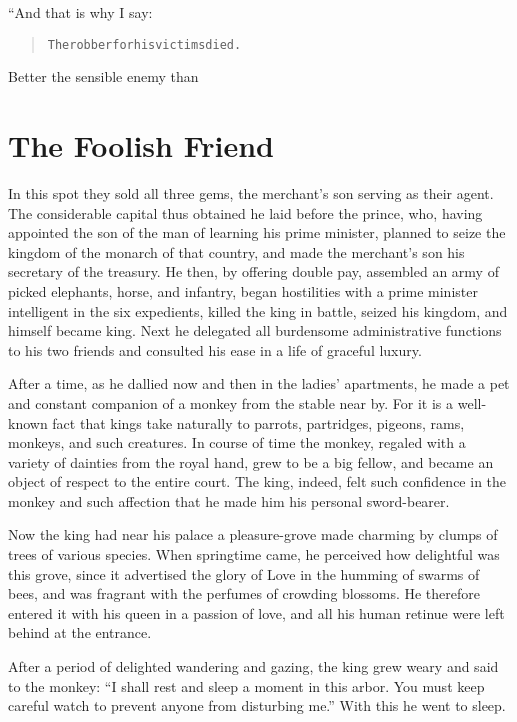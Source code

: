 \documentclass[article, twoside, 14pt]{memoir}
\renewenvironment{verbatim}{%
\begin{quote}%
\vskip -10pt%
\begin{alltt}\normalfont\large}{\end{alltt}%
\end{quote}%
\vskip -10pt
} %
\begin{document}
“And that is why I say:

\begin{verbatim}
The robber for his victims died.
\end{verbatim}
Better the sensible enemy than

\chapter{The Foolish Friend}

\label{s34}

In this spot they sold all three gems, the merchant's son serving
as their agent. The considerable capital thus obtained he laid
before the prince, who, having appointed the son of the man of
learning his prime minister, planned to seize the kingdom of
the monarch of that country, and made the merchant's son his
secretary of the treasury. He then, by offering double pay,
assembled an army of picked elephants, horse, and infantry, began
hostilities with a prime minister intelligent in the six
expedients, killed the king in battle, seized his kingdom, and
himself became king. Next he delegated all burdensome
administrative functions to his two friends and consulted his ease
in a life of graceful luxury.

After a time, as he dallied now and then in the ladies' apartments,
he made a pet and constant companion of a monkey from the stable
near by. For it is a well-known fact that kings take naturally to
parrots, partridges, pigeons, rams, monkeys, and such creatures. In
course of time the monkey, regaled with a variety of dainties from
the royal hand, grew to be a big fellow, and became an object of
respect to the entire court. The king, indeed, felt such confidence
in the monkey and such affection that he made him his personal
sword-bearer.

Now the king had near his palace a pleasure-grove made charming by
clumps of trees of various species. When springtime came, he
perceived how delightful was this grove, since it advertised the
glory of Love in the humming of swarms of bees, and was fragrant
with the perfumes of crowding blossoms. He therefore entered it
with his queen in a passion of love, and all his human retinue were
left behind at the entrance.

After a period of delighted wandering and gazing, the king grew
weary and said to the monkey:
``I shall rest and sleep a moment in this arbor. You must keep careful watch to prevent anyone from disturbing me.''
With this he went to sleep.
\end{document}
